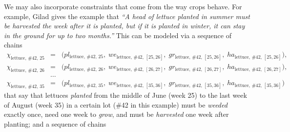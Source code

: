 \documentclass[11pt,reqno]{amsart}
\numberwithin{equation}{section}
\begin{document}
We may also incorporate constraints that come from the way crops behave. For example,
Gilad gives the example that \emph{``A head of lettuce planted in summer must be harvested
  the week after it is planted, but if it is planted in winter, it can stay in the ground
  for up to two months.''} This can be modeled via a sequence of chains 
\begin{eqnarray*}
   \chi_{\text{lettuce},\, \text{\#42},\, 25} 
   &=& 
   \big(
      pl_{\text{lettuce},\, \text{\#42},\, 25}, \; 
      we_{\text{lettuce},\, \text{\#42},\, [25,26]}, \;
      gr_{\text{lettuce},\, \text{\#42},\, [25,26]}, \;
      ha_{\text{lettuce},\, \text{\#42},\, [25,26]}
      \big), \\
   \chi_{\text{lettuce},\, \text{\#42},\, 26} 
   &=& 
   \big(
      pl_{\text{lettuce},\, \text{\#42},\, 26}, \; 
      we_{\text{lettuce},\, \text{\#42},\, [26,27]}, \;
      gr_{\text{lettuce},\, \text{\#42},\, [26,27]}, \;
      ha_{\text{lettuce},\, \text{\#42},\, [26,27]}
      \big), \\
   &\dots& \\
   \chi_{\text{lettuce},\, \text{\#42},\, 35} 
   &=& 
   \big(
      pl_{\text{lettuce},\, \text{\#42},\, 35}, \; 
      we_{\text{lettuce},\, \text{\#42},\, [35,36]}, \;
      gr_{\text{lettuce},\, \text{\#42},\, [35,36]}, \;
      ha_{\text{lettuce},\, \text{\#42},\, [35,36]}
      \big)
\end{eqnarray*}
that say that lettuces \emph{planted} from the middle of June (week 25) to the last week
of August (week 35) in a certain lot (\#42 in this example) must be \emph{weeded} exactly
once, need one week to \emph{grow}, and must be \emph{harvested} one week after planting;
and a sequence of chains
\end{document}
